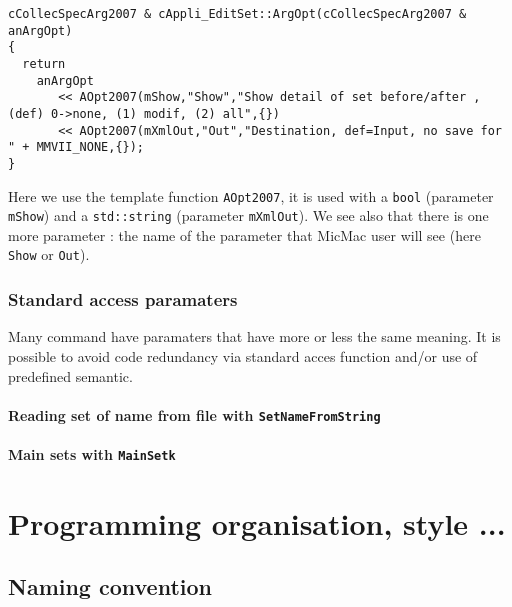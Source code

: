 \documentclass[a4paper]{book}
\begin{document}
{\small
\begin{verbatim}
cCollecSpecArg2007 & cAppli_EditSet::ArgOpt(cCollecSpecArg2007 & anArgOpt)
{
  return
    anArgOpt
       << AOpt2007(mShow,"Show","Show detail of set before/after , (def) 0->none, (1) modif, (2) all",{})
       << AOpt2007(mXmlOut,"Out","Destination, def=Input, no save for " + MMVII_NONE,{});
}
\end{verbatim}
}

Here we use the template function {\tt AOpt2007},
it is used with a {\tt bool} (parameter {\tt mShow})
and a {\tt std::string} (parameter {\tt mXmlOut}).
We see also that there is one more parameter : the name of the 
parameter that MicMac user will see (here {\tt Show} or {\tt Out}).


\subsection{Standard access paramaters}

Many command have paramaters that have more or less the
same meaning. It is possible to avoid code redundancy
via standard acces function and/or use of predefined semantic.

\subsubsection{Reading set of name from file with {\tt  SetNameFromString}}
\subsubsection{Main sets with {\tt MainSetk}}




\chapter{Programming organisation, style ...}

\section{Naming convention}
\end{document}
